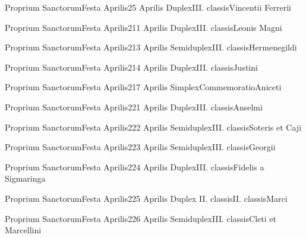 \documentclass[invitatoriale-romanum.tex]{subfiles}
\begin{document}
	{Proprium Sanctorum}{Festa Aprilis}{2}{5 Aprilis}
	{Duplex}{III. classis}{Vincentii Ferrerii}
	{}
	{}

	{Proprium Sanctorum}{Festa Aprilis}{2}{11 Aprilis}
	{Duplex}{III. classis}{Leonis Magni}
	{}
	{}

	{Proprium Sanctorum}{Festa Aprilis}{2}{13 Aprilis}
	{Semiduplex}{III. classis}{Hermenegildi}
	{}
	{}

	{Proprium Sanctorum}{Festa Aprilis}{2}{14 Aprilis}
	{Duplex}{III. classis}{Justini}
	{}
	{}

	{Proprium Sanctorum}{Festa Aprilis}{2}{17 Aprilis}
	{Simplex}{Commemoratio}{Aniceti}
	{}
	{\invitferia}

	{Proprium Sanctorum}{Festa Aprilis}{2}{21 Aprilis}
	{Duplex}{III. classis}{Anselmi}
	{}
	{}

	{Proprium Sanctorum}{Festa Aprilis}{2}{22 Aprilis}
	{Semiduplex}{III. classis}{Soteris et Caji}
	{}
	{}

	{Proprium Sanctorum}{Festa Aprilis}{2}{23 Aprilis}
	{Semiduplex}{III. classis}{Georgii}
	{}
	{}

	{Proprium Sanctorum}{Festa Aprilis}{2}{24 Aprilis}
	{Duplex}{III. classis}{Fidelis a Sigmaringa}
	{}
	{}

	{Proprium Sanctorum}{Festa Aprilis}{2}{25 Aprilis}
	{Duplex II. classis}{II. classis}{Marci}
	{}
	{}

	{Proprium Sanctorum}{Festa Aprilis}{2}{26 Aprilis}
	{Semiduplex}{III. classis}{Cleti et Marcellini}
	{}
	{}
\end{document}

